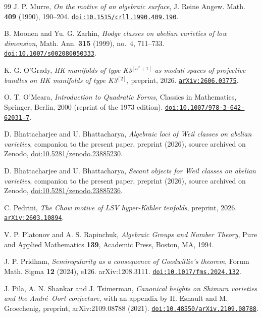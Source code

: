 \documentclass[11pt,reqno]{amsart}
\theoremstyle{plain}
\theoremstyle{definition}
\theoremstyle{remark}
\begin{document}
\begin{thebibliography}{99}
J. P. Murre,
\emph{On the motive of an algebraic surface},
J. Reine Angew. Math. \textbf{409} (1990), 190--204.
\href{https://doi.org/10.1515/crll.1990.409.190}{\texttt{doi:10.1515/crll.1990.409.190}}.

B. Moonen and Yu. G. Zarhin,
\emph{Hodge classes on abelian varieties of low dimension},
Math. Ann. \textbf{315} (1999), no.~4, 711--733.
\href{https://doi.org/10.1007/s002080050333}{\texttt{doi:10.1007/s002080050333}}.

K. G. O'Grady,
\emph{HK manifolds of type K3$^{[a^{2}+1]}$ as moduli spaces of projective
bundles on HK manifolds of type K3$^{[2]}$},
preprint, 2026.
\href{https://arxiv.org/abs/2606.03775}{\texttt{arXiv:2606.03775}}.

O. T. O'Meara,
\emph{Introduction to Quadratic Forms},
Classics in Mathematics, Springer, Berlin, 2000 (reprint of the 1973 edition).
\href{https://doi.org/10.1007/978-3-642-62031-7}{\texttt{doi:10.1007/978-3-642-62031-7}}.

D. Bhattacharjee and U. Bhattacharya,
\emph{Algebraic loci of Weil classes on abelian varieties},
companion to the present paper, preprint (2026), source archived on Zenodo,
\href{https://doi.org/10.5281/zenodo.23885230}{doi:10.5281/zenodo.23885230}.

D. Bhattacharjee and U. Bhattacharya,
\emph{Secant objects for Weil classes on abelian varieties},
companion to the present paper, preprint (2026), source archived on Zenodo,
\href{https://doi.org/10.5281/zenodo.23885236}{doi:10.5281/zenodo.23885236}.

C. Pedrini,
\emph{The Chow motive of LSV hyper-K\"ahler tenfolds},
preprint, 2026.
\href{https://arxiv.org/abs/2603.10894}{\texttt{arXiv:2603.10894}}.

V. P. Platonov and A. S. Rapinchuk,
\emph{Algebraic Groups and Number Theory},
Pure and Applied Mathematics \textbf{139},
Academic Press, Boston, MA, 1994.

J. P. Pridham,
\emph{Semiregularity as a consequence of Goodwillie's theorem},
Forum Math. Sigma \textbf{12} (2024), e126. arXiv:1208.3111.
\href{https://doi.org/10.1017/fms.2024.132}{\texttt{doi:10.1017/fms.2024.132}}.

J. Pila, A. N. Shankar and J. Tsimerman,
\emph{Canonical heights on Shimura varieties and the Andr\'e--Oort
conjecture}, with an appendix by H. Esnault and M. Groechenig,
preprint, arXiv:2109.08788 (2021).
\href{https://doi.org/10.48550/arXiv.2109.08788}{\texttt{doi:10.48550/arXiv.2109.08788}}.


\end{thebibliography}
\end{document}

